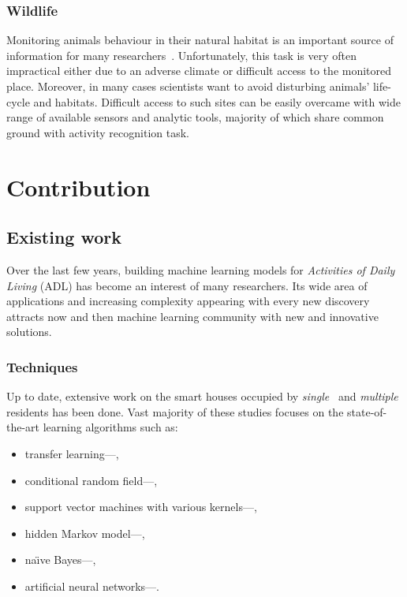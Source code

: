 \documentclass[10pt, a4paper, pdflatex, leqno, twoside, openright]{report}
\begin{document}
      \subsubsection{Wildlife}
Monitoring animals behaviour in their natural habitat is an important source of information for many researchers~\citep{Szewczyk:2004:HMS:990680.990704}. Unfortunately, this task is very often impractical either due to an adverse climate or difficult access to the monitored place. Moreover, in many cases scientists want to avoid disturbing animals' life-cycle and habitats. Difficult access to such sites can be easily overcame with wide range of available sensors and analytic tools, majority of which share common ground with activity recognition task.

  \section{Contribution}
    \subsection{Existing work}
Over the last few years, building machine learning models for \emph{Activities of Daily Living} (ADL) has become an interest of many researchers. Its wide area of applications and increasing complexity appearing with every new discovery attracts now and then machine learning community with new and innovative solutions.

    \subsubsection{Techniques}
Up to date, extensive work on the smart houses occupied by \emph{single}~\citep{cook2009assessing,fatima2013unified} and \emph{multiple}~\citep{hsu2010strategies,singla2010recognizing,crandall2009coping} residents has been done. Vast majority of these studies focuses on the state-of-the-art learning algorithms such as:
\begin{itemize}
\item transfer learning---\citet{cook2013transfer},
\item conditional random field---\citet{hsu2010strategies,van2010activity},
\item support vector machines with various kernels---\citet{fatima2013unified},
\item hidden Markov model---\citet{rashidi2011discovering},
\item na\"{\i}ve Bayes---\citet{cook2013activity},
\item artificial neural networks---\citet{fatima2013unified,fatima2013analysis}.
\end{itemize}
\end{document}
